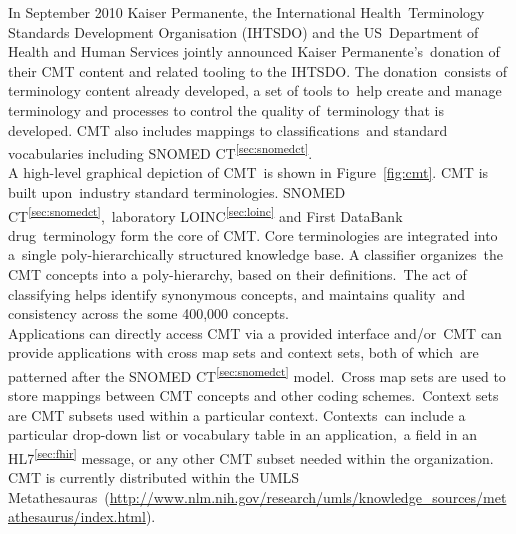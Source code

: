 \documentclass[DIV=calc, paper=a4, fontsize=12pt, onecolumn]{scrartcl}	 %
\begin{document}
  \noindent In September 2010 Kaiser Permanente, the International Health\
  Terminology Standards Development Organisation (IHTSDO) and the US\
  Department of Health and Human Services jointly announced Kaiser Permanente's\
  donation of their CMT content and related tooling to the IHTSDO. The donation\
  consists of terminology content already developed, a set of tools to\
  help create and manage terminology and processes to control the quality of\
  terminology that is developed. CMT also includes mappings to classifications\
  and standard vocabularies including SNOMED CT\textsuperscript{\ref{sec:snomedct}}.\\
  
  \noindent A high-level graphical depiction of CMT\
  is shown in Figure~\ref{fig:cmt}. CMT is built upon\
  industry standard terminologies. SNOMED CT\textsuperscript{\ref{sec:snomedct}},\
  laboratory LOINC\textsuperscript{\ref{sec:loinc}} and First DataBank drug\
  terminology form the core of CMT. Core terminologies are integrated into a\
  single poly-hierarchically structured knowledge base. A classifier organizes\
  the CMT concepts into a poly-hierarchy, based on their definitions.\
  The act of classifying helps identify synonymous concepts, and maintains quality\
  and consistency across the some 400,000 concepts.\\
  
  \noindent Applications can directly access CMT via a provided interface and/or\
  CMT can provide applications with cross map sets and context sets, both of which\
  are patterned after the SNOMED CT\textsuperscript{\ref{sec:snomedct}} model.\
  Cross map sets are used to store mappings between CMT concepts and other coding schemes.\
  Context sets are CMT subsets used within a particular context. Contexts\
  can include a particular drop-down list or vocabulary table in an application,\
  a field in an HL7\textsuperscript{\ref{sec:fhir}} message, or any other CMT subset needed within the organization.\\
  
  \noindent CMT is currently distributed within the UMLS Metathesauras\
  (\url{http://www.nlm.nih.gov/research/umls/knowledge_sources/metathesaurus/index.html}).
  

\end{document}
